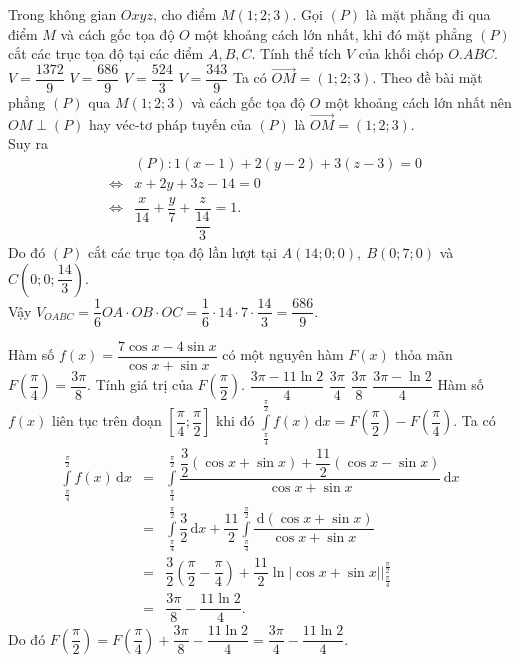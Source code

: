\begin{ex}%
	Trong không gian $Oxyz$, cho điểm $M(1;2;3)$. Gọi $(P)$ là mặt phẳng đi qua điểm $M$ và cách gốc tọa độ $O$ một khoảng cách lớn nhất, khi đó mặt phẳng $(P)$ cắt các trục tọa độ tại các điểm $A,B,C$. Tính thể tích $V$ của khối chóp $O.ABC$.
	\choice
	{$V=\dfrac{1372}{9}$}
	{\True $V=\dfrac{686}{9}$}
	{$V=\dfrac{524}{3}$}
	{$V=\dfrac{343}{9}$}
	\loigiai
	{
		Ta có $\vec{OM}=(1;2;3)$. Theo đề bài mặt phẳng $(P)$ qua $M(1;2;3)$ và cách gốc tọa độ $O$ một khoảng cách lớn nhất nên $OM\perp(P)$ hay véc-tơ pháp tuyến của $(P)$ là $\vec{OM}=(1;2;3)$.\\
		Suy ra\vspace{-3ex}
		\begin{eqnarray*}
			& &(P)\colon1(x-1)+2(y-2)+3(z-3)=0 \\
			& \Leftrightarrow & x+2y+3z-14=0\\
			& \Leftrightarrow & \dfrac{x}{14}+\dfrac{y}{7}+\dfrac{z}{\dfrac{14}{3}}=1.
		\end{eqnarray*} 
	Do đó $(P)$ cắt các trục tọa độ lần lượt tại $A(14;0;0),~B(0;7;0)$ và $C\left(0;0;\dfrac{14}{3}\right)$.\\
	Vậy $V_{OABC}=\dfrac{1}{6}OA\cdot OB\cdot OC=\dfrac{1}{6}\cdot14\cdot7\cdot\dfrac{14}{3}=\dfrac{686}{9}$.
	}
\end{ex}

\begin{ex}%
	Hàm số $f(x)=\dfrac{7\cos x-4\sin x}{\cos x+\sin x}$ có một nguyên hàm $F(x)$ thỏa mãn $F\left(\dfrac{\pi}{4}\right)=\dfrac{3\pi}{8}$. Tính giá trị của $F\left(\dfrac{\pi}{2}\right)$.
	\choice
	{\True $\dfrac{3\pi-11\ln2}{4}$}
	{$\dfrac{3\pi}{4}$}
	{$\dfrac{3\pi}{8}$}
	{$\dfrac{3\pi-\ln2}{4}$}
	\loigiai
	{
		Hàm số $f(x)$ liên tục trên đoạn $\left[\dfrac{\pi}{4};\dfrac{\pi}{2}\right]$ khi đó $\displaystyle\int\limits_\frac{\pi}{4}^\frac{\pi}{2} f(x)\mathrm{\,d}x=F\left(\dfrac{\pi}{2}\right)-F\left(\dfrac{\pi}{4}\right)$.
		Ta có
		\begin{eqnarray*}
			 \displaystyle\int\limits_\frac{\pi}{4}^\frac{\pi}{2} f(x)\mathrm{\,d}x&=&\displaystyle\int\limits_\frac{\pi}{4}^\frac{\pi}{2} \dfrac{\dfrac{3}{2}(\cos x+\sin x)+\dfrac{11}{2}(\cos x-\sin x)}{\cos x+\sin x}\mathrm{\,d}x\\
			&=& \displaystyle\int\limits_\frac{\pi}{4}^\frac{\pi}{2} \dfrac{3}{2}\mathrm{\,d}x+\dfrac{11}{2}\displaystyle\int\limits_\frac{\pi}{4}^\frac{\pi}{2}\dfrac{\mathrm{\,d}(\cos x+\sin x)}{\cos x+\sin x}\\
			&=& \dfrac{3}{2}\left(\dfrac{\pi}{2}-\dfrac{\pi}{4}\right)+\dfrac{11}{2}\ln\left|\cos x+\sin x\right|\bigg|_\frac{\pi}{4}^\frac{\pi}{2}\\
			&=& \dfrac{3\pi}{8}-\dfrac{11\ln2}{4}.
		\end{eqnarray*}
	Do đó $F\left(\dfrac{\pi}{2}\right)=F\left(\dfrac{\pi}{4}\right)+\dfrac{3\pi}{8}-\dfrac{11\ln2}{4}=\dfrac{3\pi}{4}-\dfrac{11\ln2}{4}$.
	}
\end{ex}

